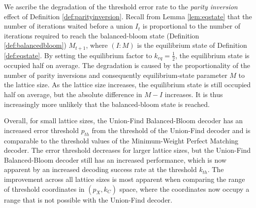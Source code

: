 We ascribe the degradation of the threshold error rate to the \emph{parity inversion} effect of Definition \ref{def:parityinversion}. Recall from Lemma \ref{lem:eqstate} that the number of iterations waited before a union $I_t$ is proportional to the number of iterations required to reach the balanced-bloom state (Definition \ref{def:balancedbloom}) $M_{t+1}$, where $(I:M)$ is the equilibrium state of Definition \ref{def:eqstate}. By setting the equilibrium factor to $k_{eq}=\frac{1}{2}$, the equilibrium state is occupied half on average. The degradation is caused by the proportionality of the number of parity inversions and consequently equilibrium-state parameter $M$ to the lattice size. As the lattice size increases, the equilibrium state is still occupied half on average, but the absolute difference in $M-I$ increases. It is thus increasingly more unlikely that the balanced-bloom state is reached. 

Overall, for small lattice sizes, the Union-Find Balanced-Bloom decoder has an increased error threshold $p_{th}$ from the threshold of the Union-Find decoder and is comparable to the threshold values of the Minimum-Weight Perfect Matching decoder. The error threshold decreases for larger lattice sizes, but the Union-Find Balanced-Bloom decoder still has an increased performance, which is now apparent by an increased decoding success rate at the threshold $k_{th}$. The improvement across all lattice sizes is most apparent when comparing the range of threshold coordinates in $(p_X, k_C)$ space, where the coordinates now occupy a range that is not possible with the Union-Find decoder. 

